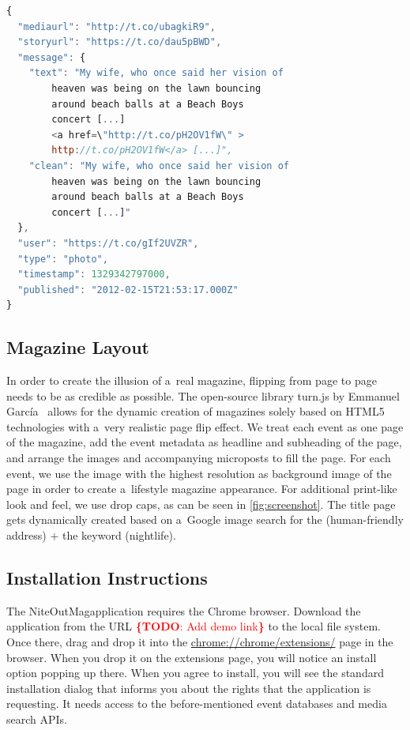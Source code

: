 \documentclass{acm_proc_article-sp}
\newcommand{\todo}[1]{\noindent\textcolor{red}{{\bf \{TODO}: #1{\bf \}}}}
\begin{document}
\begin{lstlisting}[language=JavaScript,caption={Sample output of the media collector showing a~\mbox{Google+} post (edited for legibility, URLs shortened).},label={lst:media}]
{
  "mediaurl": "http://t.co/ubagkiR9",
  "storyurl": "https://t.co/dau5pBWD",
  "message": {
    "text": "My wife, who once said her vision of
        heaven was being on the lawn bouncing
        around beach balls at a Beach Boys
        concert [...]
        <a href=\"http://t.co/pH2OV1fW\" >
        http://t.co/pH2OV1fW</a> [...]",
    "clean": "My wife, who once said her vision of
        heaven was being on the lawn bouncing
        around beach balls at a Beach Boys
        concert [...]"
  },
  "user": "https://t.co/gIf2UVZR",
  "type": "photo",
  "timestamp": 1329342797000,
  "published": "2012-02-15T21:53:17.000Z"
}
\end{lstlisting}

\subsection{Magazine Layout}
In order to create the illusion of a~real magazine,
flipping from page to page needs to be as credible as possible.
The open-source library turn.js by Emmanuel García~\cite{TurnJs2012}
allows for the dynamic creation of magazines solely based on HTML5 technologies
with a~very realistic page flip effect.
We treat each event as one page of the magazine,
add the event metadata as headline and subheading of the page,
and arrange the images and accompanying microposts to fill the page.
For each event, we use the image with the highest resolution
as background image of the page in order to create a~lifestyle magazine appearance.
For additional print-like look and feel, we use drop caps,
as can be seen in \autoref{fig:screenshot}.
The title page gets dynamically created based on a~Google image search
for the (human-friendly address) $+$ the keyword (nightlife).

\subsection{Installation Instructions}
The NiteOutMag\texttrademark application requires the Chrome browser.
Download the application from the URL \todo{Add demo link} to the local file system.
Once there, drag and drop it into the \url{chrome://chrome/extensions/} page in the browser. 
When you drop it on the extensions page, you will notice an install option popping up there.
When you agree to install, you will see the standard installation dialog
that informs you about the rights that the application is requesting.
It needs access to the before-mentioned event databases and media search APIs.
\end{document}
